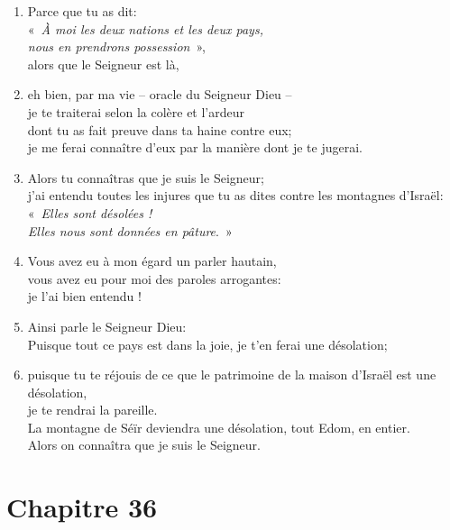\begin{enumerate}[leftmargin=\psleftmargin, labelsep = \pslabelsep, label={\arabic*}, font=\color{\pscolor}\small\textsuperscript, parsep=0em, itemsep=0em, topsep=0em ]
    \item Parce que tu as dit: \\ \decalage «~\textit{À moi les deux nations et les deux pays, \\ \decalage nous en prendrons possession}~», \\ alors que le Seigneur est là,
    \item eh bien, par ma vie – oracle du Seigneur Dieu – \\
          je te traiterai selon la colère et l’ardeur \\ dont tu as fait preuve dans ta haine contre eux; \\ je me ferai connaître d’eux par la manière dont je te jugerai.
    \item Alors tu connaîtras que je suis le Seigneur; \\ j’ai entendu toutes les injures que tu as dites contre les montagnes d’Israël: \\
    \decalage «~\textit{Elles sont désolées ! \\ \decalage Elles nous sont données en pâture}.~»
    \item Vous avez eu à mon égard un parler hautain, \\ vous avez eu pour moi des paroles arrogantes: \\ je l’ai bien entendu ! \parSpace
    \item Ainsi parle le Seigneur Dieu: \\ Puisque tout ce pays est dans la joie, je t’en ferai une désolation;
    \item puisque tu te réjouis de ce que le patrimoine de la maison d’Israël est une désolation, \\ je te rendrai la pareille.
    \\ La montagne de Séïr deviendra une désolation, tout Edom, en entier. \\ Alors on connaîtra que je suis le Seigneur.
\end{enumerate}
\newpage

\section*{Chapitre 36}
